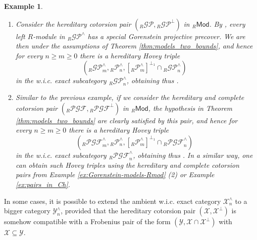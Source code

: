\documentclass[10pt,reqno]{amsart}
\numberwithin{equation}{section}
\newtheorem{example}[definition]{Example}
\theoremstyle{remark}
\newcommand{\X}{\mathcal{X}}
\newcommand{\Y}{\mathcal{Y}}
\begin{document}
\begin{example}\label{ex:method2} ~\
\begin{enumerate}
\item Consider the hereditary cotorsion pair $({}_R\mathcal{GP},{}_R\mathcal{GP}^\perp)$ in ${}_R\mathsf{Mod}$. By \cite[Thm. 2.8 \& Prop. 6.1]{BMSP}, every left $R$-module in ${}_R\mathcal{GP}^\wedge$ has a special Gorenstein projective precover. We are then under the assumptions of Theorem \ref{thm:models_two_bounds}, and hence for every $n \geq m \geq 0$ there is a hereditary Hovey triple 
\[
({}_R\mathcal{GP}^\wedge_m, {}_R\mathcal{P}^\wedge_n, [{}_R\mathcal{P}^\wedge_m]^{\perp_1} \cap {}_R\mathcal{GP}^\wedge_n)
\]
in the w.i.c. exact subcategory ${}_R\mathcal{GP}^\wedge_n$, obtaining thus \cite[Thm. 6.3 (2)]{Chains}. 

\item Similar to the previous example, if we consider the hereditary and complete cotorsion pair $({}_R\mathcal{PGF},{}_R\mathcal{PGF}^\perp)$ in ${}_R\mathsf{Mod}$, the hypothesis in Theorem \ref{thm:models_two_bounds} are clearly satisfied by this pair, and hence for every $n \geq m \geq 0$ there is a hereditary Hovey triple 
\[
({}_R\mathcal{PGF}^\wedge_m, {}_R\mathcal{P}^\wedge_n, [{}_R\mathcal{P}^\wedge_m]^{\perp_1} \cap {}_R\mathcal{PGF}^\wedge_n)
\]
in the w.i.c. exact subcategory ${}_R\mathcal{PGF}^\wedge_n$, obtaining thus \cite[Coroll. 5.3 (3)]{Chains}. In a similar way, one can obtain such Hovey triples using the hereditary and complete cotorsion pairs from Example \ref{ex:Gorenstein-models-Rmod} (2) or Example \ref{ex:pairs_in_Ch}.
\end{enumerate}
\end{example}

In some cases, it is possible to extend the ambient w.i.c. exact category $\mathcal{X}^\wedge_n$ to a bigger category $\mathcal{Y}^\wedge_n$, provided that the hereditary cotorsion pair $(\X,\X^\perp)$ is somehow compatible with a Frobenius pair of the form $(\Y,\X \cap \X^\perp)$ with $\X \subseteq \Y$. 
\end{document}
